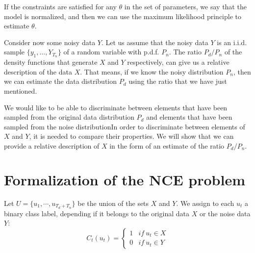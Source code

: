 If the constraints are satisfied for any $\theta$ in the set of parameters, we say that the model is normalized, and then we can use the maximum likelihood principle to estimate $\theta$.

Consider now some noisy data $Y$. Let us assume that the noisy data $Y$ is an i.i.d. sample $\{y_1,\dots,Y_{T_n}\}$ of a random variable with p.d.f. $P_n$. The ratio $P_d/P_n$ of the density functions that generate $X$ and $Y$ respectively, can give us a relative description of the data $X$. That means, if we know the noisy distribution $P_n$, then we can estimate the data distribution $P_d$ using the ratio that we have just mentioned.

We would like to be able to discriminate between elements that have been sampled from the original data distribution $P_d$ and elements that have been sampled from the noise distributionIn order to discriminate between elements of $X$ and $Y$, it is needed to compare their properties. We will show that we can provide a relative description of $X$ in the form of an estimate of the ratio $P_d/P_n$.

\section{Formalization of the NCE problem}

Let $U = \{u_1,\cdots,u_{T_d + T_n}\}$ be the union of the sets $X$ and $Y$. We assign to each $u_t$ a binary class label, depending if it belongs to the original data $X$ or the noise data $Y$:
\[
C_t(u_t) = \begin{cases}
1 & if \ u_t \in X\\
0 & if \ u_t \in Y
\end{cases}
\]

